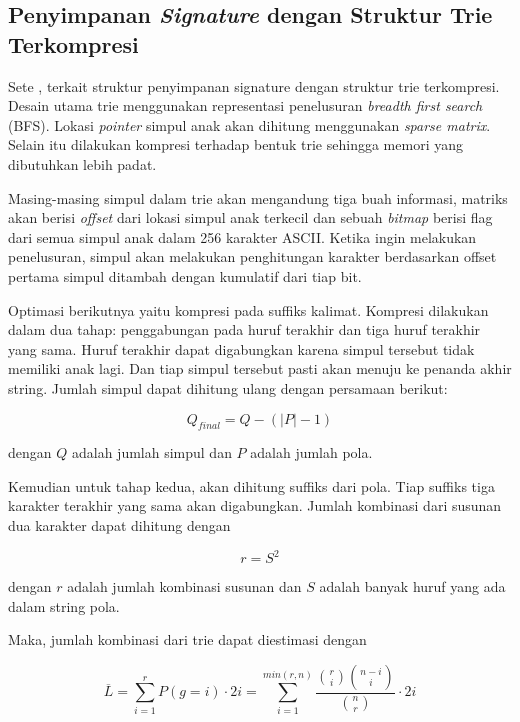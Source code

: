   \subsection{Penyimpanan \emph{Signature} dengan Struktur Trie Terkompresi}

    Sete \parencite{bellekens2014}, terkait struktur penyimpanan signature dengan struktur trie terkompresi. Desain utama trie menggunakan representasi penelusuran \emph{breadth first search} (BFS). Lokasi \emph{pointer} simpul anak akan dihitung menggunakan \emph{sparse matrix}. Selain itu dilakukan kompresi terhadap bentuk trie sehingga memori yang dibutuhkan lebih padat.

    Masing-masing simpul dalam trie akan mengandung tiga buah informasi, matriks akan berisi \emph{offset} dari lokasi simpul anak terkecil dan sebuah \emph{bitmap} berisi flag dari semua simpul anak dalam 256 karakter ASCII. Ketika ingin melakukan penelusuran, simpul akan melakukan penghitungan karakter berdasarkan offset pertama simpul ditambah dengan kumulatif dari tiap bit.

    Optimasi berikutnya yaitu kompresi pada suffiks kalimat. Kompresi dilakukan dalam dua tahap: penggabungan pada huruf terakhir dan tiga huruf terakhir yang sama. Huruf terakhir dapat digabungkan karena simpul tersebut tidak memiliki anak lagi. Dan tiap simpul tersebut pasti akan menuju ke penanda akhir string. Jumlah simpul dapat dihitung ulang dengan persamaan berikut:

    \begin{equation}
      Q_{final} = Q - \left(\left|P\right| - 1 \right)
    \end{equation}

    dengan $Q$ adalah jumlah simpul dan $P$ adalah jumlah pola.

    Kemudian untuk tahap kedua, akan dihitung suffiks dari pola. Tiap suffiks tiga karakter terakhir yang sama akan digabungkan. Jumlah kombinasi dari susunan dua karakter dapat dihitung dengan

    \begin{equation}
      r = S^2
    \end{equation}

    dengan $r$ adalah jumlah kombinasi susunan dan $S$ adalah banyak huruf yang ada dalam string pola.

    Maka, jumlah kombinasi dari trie dapat diestimasi dengan

    \begin{equation}
      \overline{L} = 
        \sum_{i=1}^{r} P\left(g = i \right) \cdot 2i =
          \sum_{i=1}^{min\left({r,n} \right)} \frac{\binom{r}{i} \binom{n - i}{i}}{\binom{n}{r}} \cdot 2i
    \end{equation}

